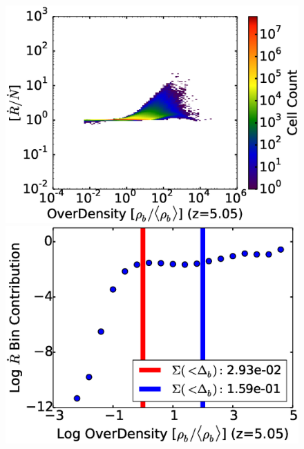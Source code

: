 \begin{figure}[!tp]
\begin{minipage}[h]{0.33\linewidth}
        \includegraphics[trim = 5mm 8mm 0mm 0mm, clip, width=1.0\textwidth]{5_1_HD24175OverDensityRecombIonFrac.eps}
     \end{minipage}
\hspace*{-2.00mm}
    \begin{minipage}[h]{0.33\linewidth}
       \centering
       \includegraphics[trim = 5mm 8mm 0mm 0mm, clip, width=1.0\textwidth]{5_2_HD24175_recomb_contrib_v_OD.eps}
     \end{minipage}
\hspace*{-4.00mm}
    \begin{minipage}[h]{0.33\linewidth}
       \centering

\end{minipage}
\end{figure}

